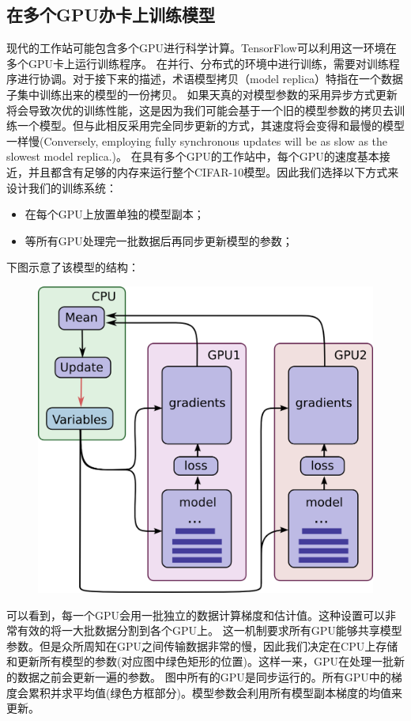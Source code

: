 \documentclass[11pt,fleqn]{book}
\begin{document}
{\subsection{在多个GPU办卡上训练模型}
现代的工作站可能包含多个GPU进行科学计算。TensorFlow可以利用这一环境在多个GPU卡上运行训练程序。
在并行、分布式的环境中进行训练，需要对训练程序进行协调。对于接下来的描述，术语模型拷贝（model replica）特指在一个数据子集中训练出来的模型的一份拷贝。
如果天真的对模型参数的采用异步方式更新将会导致次优的训练性能，这是因为我们可能会基于一个旧的模型参数的拷贝去训练一个模型。但与此相反采用完全同步更新的方式，其速度将会变得和最慢的模型一样慢(Conversely, employing fully synchronous updates will be as slow as the slowest model replica.)。
在具有多个GPU的工作站中，每个GPU的速度基本接近，并且都含有足够的内存来运行整个CIFAR-10模型。因此我们选择以下方式来设计我们的训练系统：
\begin{itemize}
\item 在每个GPU上放置单独的模型副本；
\item 等所有GPU处理完一批数据后再同步更新模型的参数；
\end{itemize}
下图示意了该模型的结构：
\begin{figure}[H]
\centering
\includegraphics[scale=0.5]{Parallelism.png}
\end{figure}
可以看到，每一个GPU会用一批独立的数据计算梯度和估计值。这种设置可以非常有效的将一大批数据分割到各个GPU上。
这一机制要求所有GPU能够共享模型参数。但是众所周知在GPU之间传输数据非常的慢，因此我们决定在CPU上存储和更新所有模型的参数(对应图中绿色矩形的位置)。这样一来，GPU在处理一批新的数据之前会更新一遍的参数。
图中所有的GPU是同步运行的。所有GPU中的梯度会累积并求平均值(绿色方框部分)。模型参数会利用所有模型副本梯度的均值来更新。
}
\end{document}
